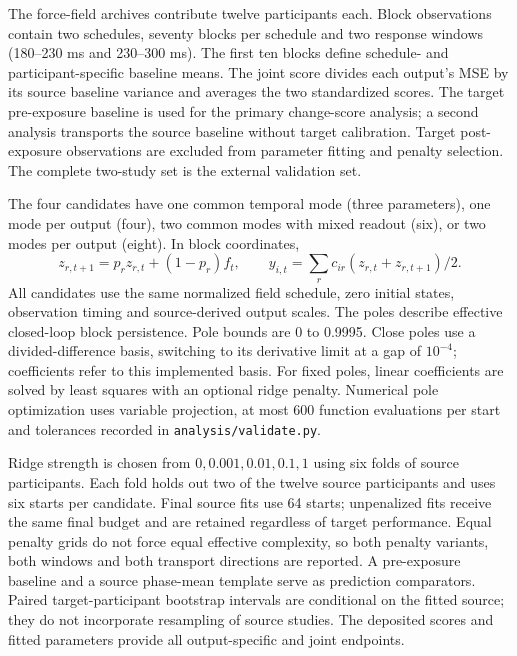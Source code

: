 \documentclass[11pt,a4paper]{article}
\begin{document}
The force-field archives contribute twelve participants each. Block observations contain two schedules, seventy blocks per schedule and two response windows (180--230 ms and 230--300 ms). The first ten blocks define schedule- and participant-specific baseline means. The joint score divides each output's MSE by its source baseline variance and averages the two standardized scores. The target pre-exposure baseline is used for the primary change-score analysis; a second analysis transports the source baseline without target calibration. Target post-exposure observations are excluded from parameter fitting and penalty selection. The complete two-study set is the external validation set. \cite{franklin2021,franklin2023}

The four candidates have one common temporal mode (three parameters), one mode per output (four), two common modes with mixed readout (six), or two modes per output (eight). In block coordinates,
\begin{equation}z_{r,t+1}=p_rz_{r,t}+(1-p_r)f_t,\qquad y_{i,t}=\sum_r c_{ir}(z_{r,t}+z_{r,t+1})/2.\end{equation}
All candidates use the same normalized field schedule, zero initial states, observation timing and source-derived output scales. The poles describe effective closed-loop block persistence. Pole bounds are 0 to 0.9995. Close poles use a divided-difference basis, switching to its derivative limit at a gap of $10^{-4}$; coefficients refer to this implemented basis. For fixed poles, linear coefficients are solved by least squares with an optional ridge penalty. Numerical pole optimization uses variable projection, at most 600 function evaluations per start and tolerances recorded in \texttt{analysis/validate.py}.

Ridge strength is chosen from $0,0.001,0.01,0.1,1$ using six folds of source participants. Each fold holds out two of the twelve source participants and uses six starts per candidate. Final source fits use 64 starts; unpenalized fits receive the same final budget and are retained regardless of target performance. Equal penalty grids do not force equal effective complexity, so both penalty variants, both windows and both transport directions are reported. A pre-exposure baseline and a source phase-mean template serve as prediction comparators. Paired target-participant bootstrap intervals are conditional on the fitted source; they do not incorporate resampling of source studies. The deposited scores and fitted parameters provide all output-specific and joint endpoints.
\end{document}

